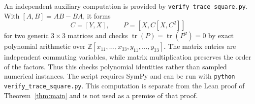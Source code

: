 \documentclass{article}
\begin{document}
An independent auxiliary computation is provided by
\texttt{verify\_trace\_square.py}. With $[A,B]=AB-BA$, it forms
\[
 C=[Y,X],\qquad P=[X,C[X,C^2]]
\]
for two generic $3\times3$ matrices and checks
$\operatorname{tr}(P)=\operatorname{tr}(P^2)=0$ by exact polynomial arithmetic
over $\mathbb Z[x_{11},\ldots,x_{33},y_{11},\ldots,y_{33}]$.
The matrix entries are independent commuting variables, while matrix
multiplication preserves the order of the factors. Thus this checks
polynomial identities rather than sampled numerical instances. The script
requires SymPy and can be run with \texttt{python verify\_trace\_square.py}.
This computation is separate from the Lean proof of
Theorem~\ref{thm:main} and is not used as a premise of that proof.



\end{document}
